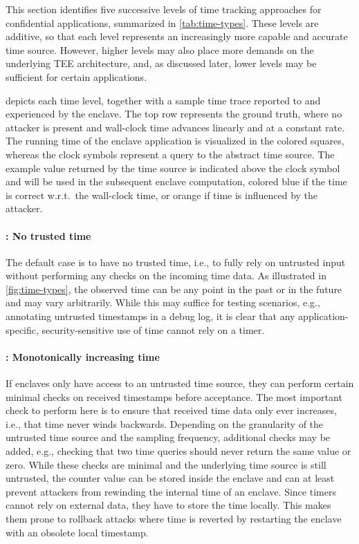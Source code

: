 This section identifies five successive levels of time tracking approaches for
confidential applications, summarized in \cref{tab:time-types}. These levels are
additive, so that each level represents an increasingly more capable and
accurate time source. However, higher levels may also place more demands on the
underlying TEE architecture, and, as discussed later, lower levels may be
sufficient for certain applications.

 depicts each time level, together with a sample time trace
reported to and experienced by the enclave. The top row represents the ground
truth, where no attacker is present and wall-clock time advances linearly and at
a constant rate. The running time of the enclave application is visualized in
the colored squares, whereas the clock symbols represent a query to the abstract
time source. The example value returned by the time source is indicated above
the clock symbol and will be used in the subsequent enclave computation, colored
blue if the time is correct w.r.t.\ the wall-clock time, or orange if time is
influenced by the attacker.

\paragraph{\Tzero: No trusted time}
The default case is to have no trusted time, i.e., to fully rely on untrusted
input without performing any checks on the incoming time data. As illustrated in
\cref{fig:time-types}, the observed time can be any point in the past or in the
future and may vary arbitrarily. While this may suffice for testing scenarios,
e.g., annotating untrusted timestamps in a debug log, it is clear that any
application-specific, security-sensitive use of time cannot rely on a \Tzero{}
timer.

\paragraph{\Tone: Monotonically increasing time}
If enclaves only have access to an untrusted time source, they can perform
certain minimal checks on received timestamps before acceptance. The most
important check to perform here is to ensure that received time data only ever
increases, i.e., that time never winds backwards. Depending on the granularity
of the untrusted time source and the sampling frequency, additional checks may
be added, e.g., checking that two time queries should never return the same
value or zero. While these checks are minimal and the underlying time source is
still untrusted, the counter value can be stored inside the enclave and \Tone{}
can at least prevent attackers from rewinding  the internal time of an enclave.
Since \Tone{} timers cannot rely on external data, they have to store the time
locally. This makes them prone to rollback attacks where time is reverted by
restarting the enclave with an obsolete local timestamp.

